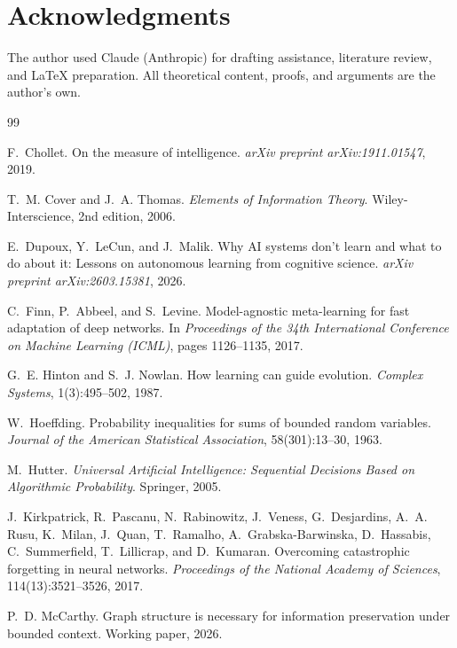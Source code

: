 \documentclass[11pt]{article}
\theoremstyle{definition}
\begin{document}
\section*{Acknowledgments}

The author used Claude (Anthropic) for drafting assistance, literature review, and \LaTeX{} preparation. All theoretical content, proofs, and arguments are the author's own.


\begin{thebibliography}{99}

F.~Chollet.
\newblock On the measure of intelligence.
\newblock \emph{arXiv preprint arXiv:1911.01547}, 2019.

T.~M. Cover and J.~A. Thomas.
\newblock \emph{Elements of Information Theory}.
\newblock Wiley-Interscience, 2nd edition, 2006.

E.~Dupoux, Y.~LeCun, and J.~Malik.
\newblock Why {AI} systems don't learn and what to do about it: Lessons on
  autonomous learning from cognitive science.
\newblock \emph{arXiv preprint arXiv:2603.15381}, 2026.

C.~Finn, P.~Abbeel, and S.~Levine.
\newblock Model-agnostic meta-learning for fast adaptation of deep networks.
\newblock In \emph{Proceedings of the 34th International Conference on Machine
  Learning (ICML)}, pages 1126--1135, 2017.

G.~E. Hinton and S.~J. Nowlan.
\newblock How learning can guide evolution.
\newblock \emph{Complex Systems}, 1(3):495--502, 1987.

W.~Hoeffding.
\newblock Probability inequalities for sums of bounded random variables.
\newblock \emph{Journal of the American Statistical Association},
  58(301):13--30, 1963.

M.~Hutter.
\newblock \emph{Universal Artificial Intelligence: Sequential Decisions Based
  on Algorithmic Probability}.
\newblock Springer, 2005.

J.~Kirkpatrick, R.~Pascanu, N.~Rabinowitz, J.~Veness, G.~Desjardins,
  A.~A. Rusu, K.~Milan, J.~Quan, T.~Ramalho, A.~Grabska-Barwinska,
  D.~Hassabis, C.~Summerfield, T.~Lillicrap, and D.~Kumaran.
\newblock Overcoming catastrophic forgetting in neural networks.
\newblock \emph{Proceedings of the National Academy of Sciences},
  114(13):3521--3526, 2017.

P.~D. McCarthy.
\newblock Graph structure is necessary for information preservation under
  bounded context.
\newblock Working paper, 2026.


\end{thebibliography}
\end{document}
